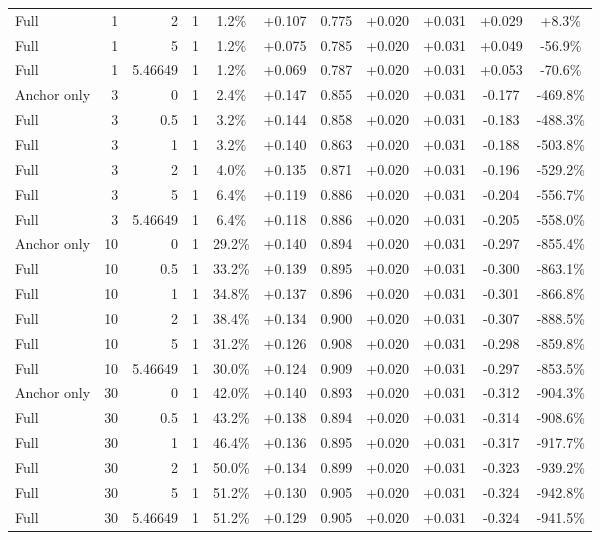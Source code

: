\begin{table}[htbp]
\begin{tabular}{lrrrccccccc}
Full & 1 & 2 & 1 & 1.2\% & +0.107 & 0.775 & +0.020 & +0.031 & +0.029 & +8.3\% \\
Full & 1 & 5 & 1 & 1.2\% & +0.075 & 0.785 & +0.020 & +0.031 & +0.049 & -56.9\% \\
Full & 1 & 5.46649 & 1 & 1.2\% & +0.069 & 0.787 & +0.020 & +0.031 & +0.053 & -70.6\% \\
Anchor only & 3 & 0 & 1 & 2.4\% & +0.147 & 0.855 & +0.020 & +0.031 & -0.177 & -469.8\% \\
Full & 3 & 0.5 & 1 & 3.2\% & +0.144 & 0.858 & +0.020 & +0.031 & -0.183 & -488.3\% \\
Full & 3 & 1 & 1 & 3.2\% & +0.140 & 0.863 & +0.020 & +0.031 & -0.188 & -503.8\% \\
Full & 3 & 2 & 1 & 4.0\% & +0.135 & 0.871 & +0.020 & +0.031 & -0.196 & -529.2\% \\
Full & 3 & 5 & 1 & 6.4\% & +0.119 & 0.886 & +0.020 & +0.031 & -0.204 & -556.7\% \\
Full & 3 & 5.46649 & 1 & 6.4\% & +0.118 & 0.886 & +0.020 & +0.031 & -0.205 & -558.0\% \\
Anchor only & 10 & 0 & 1 & 29.2\% & +0.140 & 0.894 & +0.020 & +0.031 & -0.297 & -855.4\% \\
Full & 10 & 0.5 & 1 & 33.2\% & +0.139 & 0.895 & +0.020 & +0.031 & -0.300 & -863.1\% \\
Full & 10 & 1 & 1 & 34.8\% & +0.137 & 0.896 & +0.020 & +0.031 & -0.301 & -866.8\% \\
Full & 10 & 2 & 1 & 38.4\% & +0.134 & 0.900 & +0.020 & +0.031 & -0.307 & -888.5\% \\
Full & 10 & 5 & 1 & 31.2\% & +0.126 & 0.908 & +0.020 & +0.031 & -0.298 & -859.8\% \\
Full & 10 & 5.46649 & 1 & 30.0\% & +0.124 & 0.909 & +0.020 & +0.031 & -0.297 & -853.5\% \\
Anchor only & 30 & 0 & 1 & 42.0\% & +0.140 & 0.893 & +0.020 & +0.031 & -0.312 & -904.3\% \\
Full & 30 & 0.5 & 1 & 43.2\% & +0.138 & 0.894 & +0.020 & +0.031 & -0.314 & -908.6\% \\
Full & 30 & 1 & 1 & 46.4\% & +0.136 & 0.895 & +0.020 & +0.031 & -0.317 & -917.7\% \\
Full & 30 & 2 & 1 & 50.0\% & +0.134 & 0.899 & +0.020 & +0.031 & -0.323 & -939.2\% \\
Full & 30 & 5 & 1 & 51.2\% & +0.130 & 0.905 & +0.020 & +0.031 & -0.324 & -942.8\% \\
Full & 30 & 5.46649 & 1 & 51.2\% & +0.129 & 0.905 & +0.020 & +0.031 & -0.324 & -941.5\% \\

\end{tabular}
\end{table}
